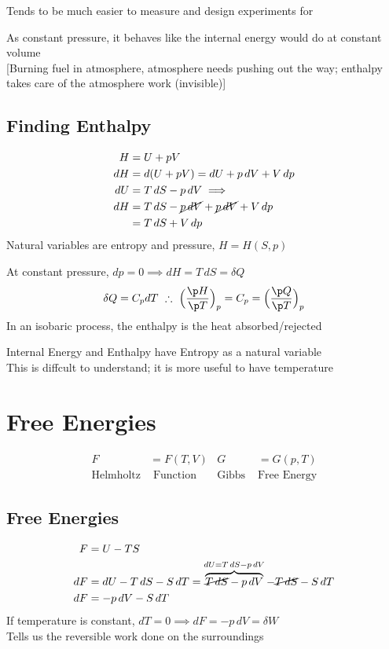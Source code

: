 \documentclass[a4paper, 11pt, normalem]{report}
\begin{document}
Tends to be much easier to measure and design experiments for

As constant pressure, it behaves like the internal energy would do at constant volume \\
{[}Burning fuel in atmosphere, atmosphere needs pushing out the way; enthalpy takes care of the atmosphere work (invisible){]}

\subsection{Finding Enthalpy}
\begin{align*}
    H &= U + pV \\
    dH &= d(U + pV) = dU + p\,dV + V\,dp \\
    dU &= T\,dS - p\,dV \implies \\
    dH &= T\,dS - \cancel{p\,dV} + \cancel{p\,dV} + V\,dp \\
       &= T\,dS + V\,dp
\end{align*}
Natural variables are entropy and pressure, $H = H(S,p)$

At constant pressure, $dp = 0 \implies dH = T\,dS = \delta Q$
\begin{equation*}
    \delta Q = C_p dT ~\therefore~ \Big(\frac{\p H}{\p T}\Big)_p = C_p = \Big(\frac{\p Q}{\p T}\Big)_p
\end{equation*}
In an isobaric process, the enthalpy is the heat absorbed/rejected

Internal Energy and Enthalpy have Entropy as a natural variable \\
This is diffcult to understand; it is more useful to have temperature

\section{Free Energies}
\begin{align*}
    F &= F(T,V) & G &= G(p, T) \\
    \text{Helmholtz}& \text{ Function} & \text{Gibbs }&\text{Free Energy}
\end{align*}

\subsection{Free Energies}
\begin{align*}
    F &= U - TS \\
    dF &= dU - T\,dS - S\,dT = \overbrace{\cancel{T\,dS} - p\,dV}^{dU = T\,dS - p\,dV} - \cancel{T\,dS} - S\,dT \\
    dF &= -p\,dV - S\,dT
\end{align*}
If temperature is constant, $dT = 0 \implies dF = -p\,dV = \delta W$ \\
Tells us the reversible work done on the surroundings
\end{document}
